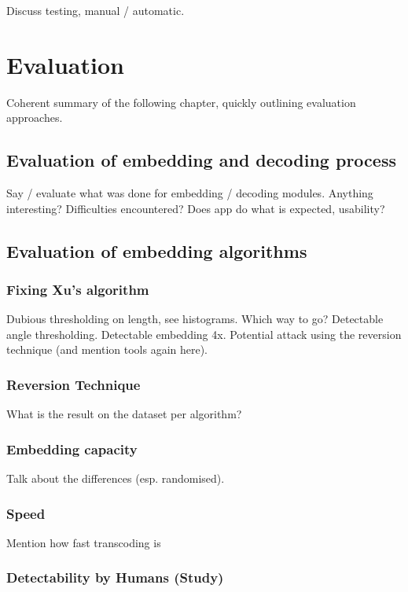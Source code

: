\documentclass[12pt,british,twoside,notitlepage,usenames,dvipsnames,hypens,final]{report}
\numberwithin{equation}{section}
\numberwithin{figure}{section}
\begin{document}
Discuss testing, manual / automatic.

\cleardoublepage
\chapter{Evaluation}

Coherent summary of the following chapter, quickly outlining evaluation approaches.

\section{Evaluation of embedding and decoding process}

Say / evaluate what was done for embedding / decoding modules. Anything interesting? Difficulties encountered? Does app do what is expected, usability?

\section{Evaluation of embedding algorithms}

\subsection{Fixing Xu's algorithm}

Dubious thresholding on length, see histograms. Which way to go?
Detectable angle thresholding.
Detectable embedding 4x.
Potential attack using the reversion technique (and mention tools again here).

\subsection{Reversion Technique}
\label{rev-tech}

What is the result on the dataset per algorithm?

\subsection{Embedding capacity}

Talk about the differences (esp. randomised).

\subsection{Speed}

Mention how fast transcoding is

\subsection{Detectability by Humans (Study)}
\end{document}
